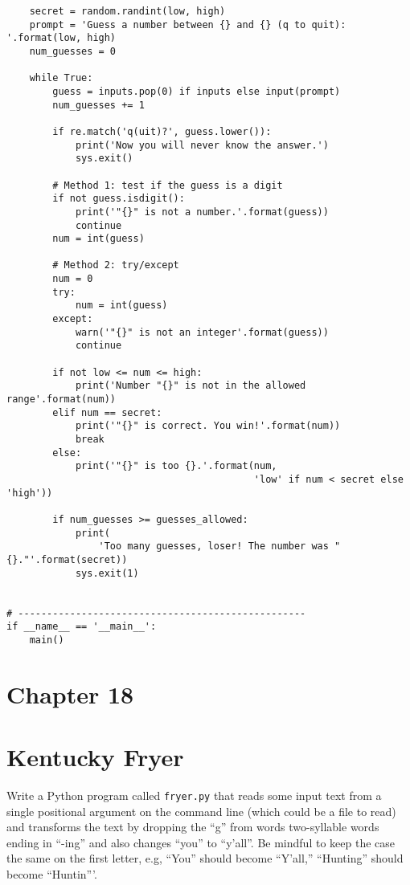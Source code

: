 \documentclass[]{article}
\begin{document}
\begin{verbatim}
    secret = random.randint(low, high)
    prompt = 'Guess a number between {} and {} (q to quit): '.format(low, high)
    num_guesses = 0

    while True:
        guess = inputs.pop(0) if inputs else input(prompt)
        num_guesses += 1

        if re.match('q(uit)?', guess.lower()):
            print('Now you will never know the answer.')
            sys.exit()

        # Method 1: test if the guess is a digit
        if not guess.isdigit():
            print('"{}" is not a number.'.format(guess))
            continue
        num = int(guess)

        # Method 2: try/except
        num = 0
        try:
            num = int(guess)
        except:
            warn('"{}" is not an integer'.format(guess))
            continue

        if not low <= num <= high:
            print('Number "{}" is not in the allowed range'.format(num))
        elif num == secret:
            print('"{}" is correct. You win!'.format(num))
            break
        else:
            print('"{}" is too {}.'.format(num,
                                           'low' if num < secret else 'high'))

        if num_guesses >= guesses_allowed:
            print(
                'Too many guesses, loser! The number was "{}."'.format(secret))
            sys.exit(1)


# --------------------------------------------------
if __name__ == '__main__':
    main()
\end{verbatim}

\pagebreak

\hypertarget{chapter-18}{%
\section{Chapter 18}\label{chapter-18}}

\hypertarget{kentucky-fryer}{%
\section{Kentucky Fryer}\label{kentucky-fryer}}

Write a Python program called \texttt{fryer.py} that reads some input
text from a single positional argument on the command line (which could
be a file to read) and transforms the text by dropping the ``g'' from
words two-syllable words ending in ``-ing'' and also changes ``you'' to
``y'all''. Be mindful to keep the case the same on the first letter,
e.g, ``You'' should become ``Y'all,'' ``Hunting'' should become
``Huntin'''.
\end{document}
